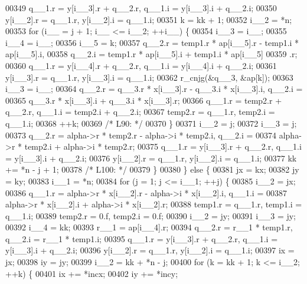 \begin{DoxyCode}
00349         q\_\_1.r = y[i\_\_3].r + q\_\_2.r, q\_\_1.i = y[i\_\_3].i + q\_\_2.i;
00350         y[i\_\_2].r = q\_\_1.r, y[i\_\_2].i = q\_\_1.i;
00351         k = kk + 1;
00352         i\_\_2 = *n;
00353         \textcolor{keywordflow}{for} (i\_\_ = j + 1; i\_\_ <= i\_\_2; ++i\_\_) \{
00354             i\_\_3 = i\_\_;
00355             i\_\_4 = i\_\_;
00356             i\_\_5 = k;
00357             q\_\_2.r = temp1.r * ap[i\_\_5].r - temp1.i * ap[i\_\_5].i, 
00358                 q\_\_2.i = temp1.r * ap[i\_\_5].i + temp1.i * ap[i\_\_5]
00359                 .r;
00360             q\_\_1.r = y[i\_\_4].r + q\_\_2.r, q\_\_1.i = y[i\_\_4].i + q\_\_2.i;
00361             y[i\_\_3].r = q\_\_1.r, y[i\_\_3].i = q\_\_1.i;
00362             r\_cnjg(&q\_\_3, &ap[k]);
00363             i\_\_3 = i\_\_;
00364             q\_\_2.r = q\_\_3.r * x[i\_\_3].r - q\_\_3.i * x[i\_\_3].i, q\_\_2.i =
00365                  q\_\_3.r * x[i\_\_3].i + q\_\_3.i * x[i\_\_3].r;
00366             q\_\_1.r = temp2.r + q\_\_2.r, q\_\_1.i = temp2.i + q\_\_2.i;
00367             temp2.r = q\_\_1.r, temp2.i = q\_\_1.i;
00368             ++k;
00369 \textcolor{comment}{/* L90: */}
00370         \}
00371         i\_\_2 = j;
00372         i\_\_3 = j;
00373         q\_\_2.r = alpha->r * temp2.r - alpha->i * temp2.i, q\_\_2.i = 
00374             alpha->r * temp2.i + alpha->i * temp2.r;
00375         q\_\_1.r = y[i\_\_3].r + q\_\_2.r, q\_\_1.i = y[i\_\_3].i + q\_\_2.i;
00376         y[i\_\_2].r = q\_\_1.r, y[i\_\_2].i = q\_\_1.i;
00377         kk += *n - j + 1;
00378 \textcolor{comment}{/* L100: */}
00379         \}
00380     \} \textcolor{keywordflow}{else} \{
00381         jx = kx;
00382         jy = ky;
00383         i\_\_1 = *n;
00384         \textcolor{keywordflow}{for} (j = 1; j <= i\_\_1; ++j) \{
00385         i\_\_2 = jx;
00386         q\_\_1.r = alpha->r * x[i\_\_2].r - alpha->i * x[i\_\_2].i, q\_\_1.i =
00387              alpha->r * x[i\_\_2].i + alpha->i * x[i\_\_2].r;
00388         temp1.r = q\_\_1.r, temp1.i = q\_\_1.i;
00389         temp2.r = 0.f, temp2.i = 0.f;
00390         i\_\_2 = jy;
00391         i\_\_3 = jy;
00392         i\_\_4 = kk;
00393         r\_\_1 = ap[i\_\_4].r;
00394         q\_\_2.r = r\_\_1 * temp1.r, q\_\_2.i = r\_\_1 * temp1.i;
00395         q\_\_1.r = y[i\_\_3].r + q\_\_2.r, q\_\_1.i = y[i\_\_3].i + q\_\_2.i;
00396         y[i\_\_2].r = q\_\_1.r, y[i\_\_2].i = q\_\_1.i;
00397         ix = jx;
00398         iy = jy;
00399         i\_\_2 = kk + *n - j;
00400         \textcolor{keywordflow}{for} (k = kk + 1; k <= i\_\_2; ++k) \{
00401             ix += *incx;
00402             iy += *incy;

\end{DoxyCode}
